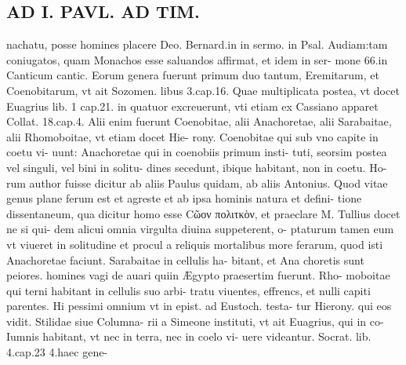 \documentclass{article}
\begin{document}
\begin{pages}
\section*{AD I. PAVL. AD TIM. }
\marginpar{[ p.218 ]}\pstart nachatu, posse homines placere Deo. Bernard.in in sermo. in Psal. Audiam:tam coniugatos, quam Monachos esse saluandos affirmat, et idem in ser- mone 66.in Canticum cantic. Eorum genera fuerunt primum duo tantum, Eremitarum, et Coenobitarum, vt ait Sozomen. libus 3.cap.16. Quae multiplicata postea, vt docet Euagrius lib. 1 cap.21. in quatuor excreuerunt, vti etiam ex Cassiano apparet Collat. 18.cap.4. Alii enim fuerunt Coenobitae, alii Anachoretae, alii Sarabaitae, alii Rhomoboitae, vt etiam docet Hie- rony. Coenobitae qui sub vno capite in coetu vi- uunt: Anachoretae qui in coenobiis primum insti- tuti, seorsim postea vel singuli, vel bini in solitu- dines secedunt, ibique habitant, non in coetu. Ho- rum author fuisse dicitur ab aliis Paulus quidam, ab aliis Antonius. Quod vitae genus plane ferum est et agreste et ab ipsa hominis natura et defini- tione dissentaneum, qua dicitur homo esse Cῶον πολιτκὸν, et praeclare M. Tullius docet ne si qui- dem alicui omnia virgulta diuina suppeterent, o- ptaturum tamen eum vt viueret in solitudine et procul a reliquis mortalibus more ferarum, quod isti Anachoretae faciunt. Sarabaitae in cellulis ha- bitant, et Ana choretis sunt peiores. homines vagi de auari quiin Ægypto praesertim fuerunt. Rho- moboitae qui terni habitant in cellulis suo arbi- tratu viuentes, effrencs, et nulli capiti parentes. Hi pessimi omnium vt in epist. ad Eustoch. testa- tur Hierony. qui eos vidit. Stilidae siue Columna- rii a Simeone instituti, vt ait Euagrius, qui in co- Iumnis habitant, vt nec in terra, nec in coelo vi- uere videantur. Socrat. lib. 4.cap.23 4.haec gene-  \pend

\end{pages}
\end{document}
